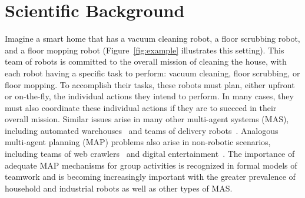 \documentclass[11pt]{article}
\begin{document}

\section{Scientific Background}



Imagine a smart home that has a vacuum cleaning robot, a floor scrubbing robot, and a floor mopping robot (Figure~\ref{fig:example} illustrates this setting). This team of robots is committed to the overall mission of cleaning the house, with each robot having a specific task to perform: vacuum cleaning, floor scrubbing, or floor mopping. To accomplish their tasks, these robots must plan, either upfront or on-the-fly, the individual actions they intend to perform. In many cases, they must also coordinate these individual actions if they are to succeed in their overall mission. Similar issues arise in many other multi-agent systems (MAS), including automated warehouses~\cite{martinez2010autonomous,vivaldini2011intelligent} and teams of delivery robots~\cite{coltin2014scheduling}.  Analogous multi-agent planning (MAP) problems also arise in non-robotic scenarios, including teams of web crawlers~\cite{chiu2005towards,pant2002myspiders,sato2012agent} and digital entertainment~\cite{jaklin2013way}.  
The importance of adequate MAP mechanisms for group activities is recognized in formal models of teamwork and is becoming increasingly important with the greater prevalence of household and industrial robots as well as other types of MAS. %




\end{document}
